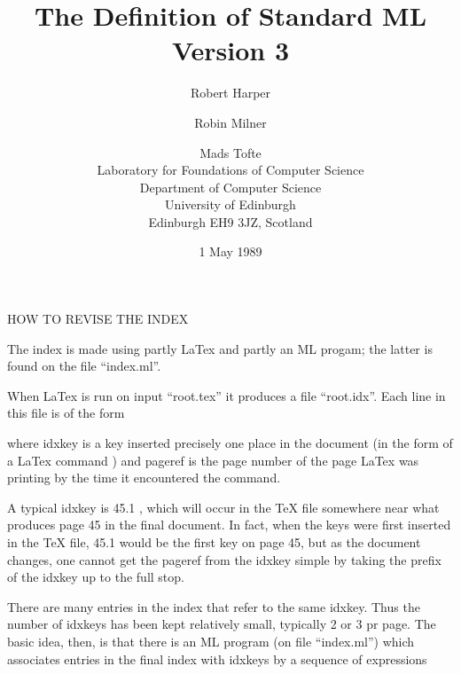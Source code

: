 \title{The Definition of Standard ML\\ Version 3}
\author{Robert Harper \and Robin Milner \and Mads Tofte \\
Laboratory for Foundations of Computer Science\\
Department of Computer Science\\
University of Edinburgh\\
Edinburgh EH9 3JZ, Scotland}
\date{1 May 1989}
\makeindex
%
%
\voffset -12mm

\pagestyle{empty}
\maketitle
\cleardoublepage
\pagestyle{plain}
\setcounter{page}{3}
\renewcommand{\thepage}{\roman{page}}



\tableofcontents
\cleardoublepage
\pagestyle{headings}
\setcounter{page}{1}
\renewcommand{\thepage}{\arabic{page}}








\appendix








 HOW TO REVISE THE INDEX 

The index is made using partly LaTex and partly an ML progam;
the latter is found on the file ``index.ml''. 

When LaTex is run on input ``root.tex'' it produces a file ``root.idx''.
Each line in this file is of the form


where idxkey is a key inserted precisely one place in the document 
(in the form of a LaTex command )
and pageref is the page number of the page LaTex was printing
by the time it encountered the  command.

A typical idxkey is 45.1 , which will occur in the TeX file 
somewhere near what produces page 45 in the final document. 
In fact, when the keys were first inserted in the TeX file, 
45.1 would be the first key on page 45, but as the document changes, 
one cannot get the pageref from the idxkey simple by taking the 
prefix of the idxkey up to the full stop.

There are many entries in the index that refer to the same
idxkey. Thus the number of idxkeys has been kept relatively
small, typically 2 or 3 pr page. The basic idea, then, is that
there is an ML program (on file ``index.ml'') which
associates entries in the final index with idxkeys by 
a sequence of expressions

